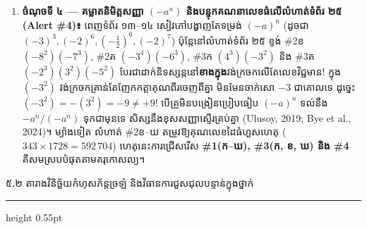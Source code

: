 \documentclass[a4paper,12pt]{article}
\newcommand{\en}[1]{{\TimesEn #1}}
\newcommand{\enbf}[1]{{\TimesEn\textbf{#1}}}
\newcommand{\subsectitle}[1]{{\muol\fontsize{11.5pt}{15.5pt}\selectfont #1}}
\newcommand{\subsec}[1]{%
  \Needspace{1.6cm}%
  \vspace{2pt}%
  \subsectitle{#1}\par%
  \vspace{-2pt}%
  {\color{black}\hrule height 0.55pt}%
  \vspace{2pt}%
}
\begin{document}
\begin{enumerate}[leftmargin=0.65cm, itemsep=2.5pt]
  \item \textbf{ចំណុចទី ៤ — គម្លាតនិមិត្តសញ្ញា \en{$(-a^n)$} និងបន្ទុកគណនាលេខធំលើលំហាត់ទំព័រ ២៥ (\en{Alert \#4})៖} ពេញទំព័រ ១៣\en{--}១៤ សៀវភៅបង្ហាញតែទម្រង់ $(-a)^n$ (ដូចជា $(-3)^3, (-2)^6, (-\frac{1}{2})^6, (-2)^7$) ប៉ុន្តែនៅលំហាត់ទំព័រ ២៥ ខ្ទង់ \en{\#2}ខ $(-8^2)(-7^3)$, \en{\#2}គ $(-3^4)(-6^3)$, \en{\#3}ក $(4^3)(-3^2)$ និង \en{\#3}គ $(-2^3)(3^2)(-5^2)$ បែរជាដាក់និទស្សន្តនៅ\textbf{ខាងក្នុង}វង់ក្រចកលើតែលេខវិជ្ជមាន! ក្នុង $(-3^2)$ វង់ក្រចកគ្រាន់តែញែកកត្តាគុណពីរចេញពីគ្នា មិនមែនចាក់សោ $-3$ ជាគោលទេ ដូច្នេះ $(-3^2) = -(3^2) = -9 \neq +9$! បើគ្រូមិនបង្រៀនប្រៀបធៀប $(-a)^n$ ទល់នឹង $-a^n / (-a^n)$ ទុកជាមុនទេ សិស្សនឹងខុសសញ្ញាស្ទើរគ្រប់គ្នា \en{(Ulusoy, 2019; Bye et al., 2024)}។ ម្យ៉ាងទៀត លំហាត់ \en{\#2}ខ\en{--}ឃ តម្រូវឱ្យគុណលេខដៃធំហួសហេតុ ($343\times 1728 = 592\,704$) ហេតុនេះការជ្រើសរើស \textbf{\en{\#1}(ក\en{--}ឃ), \en{\#3}(ក\en{,} ខ\en{,} ឃ) និង \en{\#4}} គឺសមស្របបំផុតតាមគរុកោសល្យ។
\end{enumerate}

\subsec{៥\enbf{.}២ តារាងវិនិច្ឆ័យកំហុសភ័ន្តច្រឡំ និងវិធានការជួសជុលបន្ទាន់ក្នុងថ្នាក់}
\end{document}
